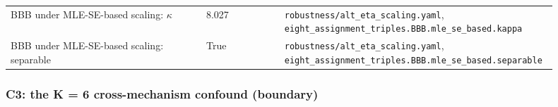 \begin{longtable}{p{0.35\linewidth} p{0.14\linewidth} p{0.41\linewidth}}
BBB under MLE-SE-based scaling: $\kappa$ & 8.027 & \texttt{\footnotesize robustness/alt\_\allowbreak{}eta\_\allowbreak{}scaling.\allowbreak{}yaml}, \texttt{\footnotesize eight\_\allowbreak{}assignment\_\allowbreak{}triples.\allowbreak{}BBB.\allowbreak{}mle\_\allowbreak{}se\_\allowbreak{}based.\allowbreak{}kappa} \\
BBB under MLE-SE-based scaling: separable & True & \texttt{\footnotesize robustness/alt\_\allowbreak{}eta\_\allowbreak{}scaling.\allowbreak{}yaml}, \texttt{\footnotesize eight\_\allowbreak{}assignment\_\allowbreak{}triples.\allowbreak{}BBB.\allowbreak{}mle\_\allowbreak{}se\_\allowbreak{}based.\allowbreak{}separable} \\
\bottomrule
\end{longtable}

\subsubsection*{C3: the K = 6 cross-mechanism confound (boundary)}
